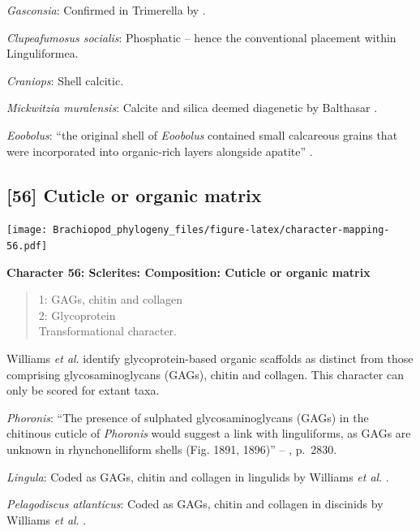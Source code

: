 \documentclass[openany]{book}
\theoremstyle{definition}
\theoremstyle{definition}
\theoremstyle{definition}
\theoremstyle{remark}
\begin{document}
\emph{Gasconsia}: Confirmed in Trimerella by
\citet{Balthasar2011Relicaragonite}.

\emph{Clupeafumosus socialis}: Phosphatic -- hence the conventional
placement within Linguliformea.

\emph{Craniops}: Shell calcitic.

\emph{Mickwitzia muralensis}: Calcite and silica deemed diagenetic by
Balthasar \citeyearpar{Balthasar2004Shellstructure}.

\emph{Eoobolus}: ``the original shell of \emph{Eoobolus} contained small
calcareous grains that were incorporated into organic-rich layers
alongside apatite'' \citep{Balthasar2007Anearly}.

\hypertarget{cuticle-or-organic-matrix}{%
\subsection*{{[}56{]} Cuticle or organic
matrix}\label{cuticle-or-organic-matrix}}

\texttt{[image: Brachiopod\_phylogeny\_files/figure-latex/character-mapping-56.pdf]}

\textbf{Character 56: Sclerites: Composition: Cuticle or organic matrix}

\begin{quote}
1: GAGs, chitin and collagen\\
2: Glycoprotein\\
Transformational character.
\end{quote}

Williams \emph{et al}. \citeyearpar{Williams1996Asupra} identify
glycoprotein-based organic scaffolds as distinct from those comprising
glycosaminoglycans (GAGs), chitin and collagen. This character can only
be scored for extant taxa.

\emph{Phoronis}: ``The presence of sulphated glycosaminoglycans (GAGs)
in the chitinous cuticle of \emph{Phoronis}
\citep[p.~215]{Herrmann1997Phoronida} would suggest a link with
linguliforms, as GAGs are unknown in rhynchonelliform shells (Fig. 1891,
1896)'' -- \citet{Williams2007PartH}, p.~2830.

\emph{Lingula}: Coded as GAGs, chitin and collagen in lingulids by
Williams \emph{et al}. \citeyearpar{Williams1996Asupra}.

\emph{Pelagodiscus atlanticus}: Coded as GAGs, chitin and collagen in
discinids by Williams \emph{et al}. \citeyearpar{Williams1996Asupra}.
\end{document}
